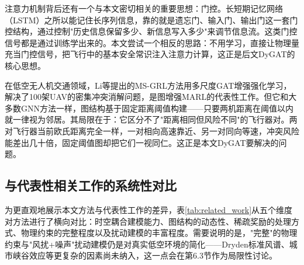 \documentclass[12pt,a4paper,UTF8]{ctexart}
\begin{document}
注意力机制背后还有一个与本文密切相关的重要思想：门控。长短期记忆网络（LSTM）\cite{ref37}之所以能记住长序列信息，靠的就是遗忘门、输入门、输出门这一套门控结构，通过控制"历史信息保留多少、新信息写入多少"来调节信息流。这类门控信号都是通过训练学出来的。本文尝试一个相反的思路：不用学习，直接让物理量充当门控信号，把飞行中的基本安全常识注入注意力计算，这正是后文DyGAT的核心思想。

在低空无人机交通领域，Li等\cite{ref10}提出的MS-GRL方法用多尺度GAT增强强化学习，解决了100架UAV的密集冲突消解问题，是图增强MARL的代表性工作。但它和大多数GNN方法一样，图结构基于固定距离阈值构建——只要两机距离在阈值以内就一律视为邻居。其局限在于：它区分不了"距离相同但风险不同"的飞行器对。两对飞行器当前欧氏距离完全一样，一对相向高速靠近、另一对同向等速，冲突风险能差出几十倍，固定阈值图却把它们一视同仁。这正是本文DyGAT要解决的问题。

\subsection{与代表性相关工作的系统性对比}

为更直观地展示本文方法与代表性工作的差异，表\ref{tab:related_work}从五个维度对方法进行了横向对比：时空耦合建模能力、图结构的动态性、稀疏奖励的处理方式、物理约束的完整程度以及扰动建模的丰富程度。需要说明的是，"完整"的物理约束与"风扰+噪声"扰动建模仍是对真实低空环境的简化——Dryden标准风谱、城市峡谷效应等更复杂的因素尚未纳入，这一点会在第6.3节作为局限性讨论。

\begin{table}[H]
    \centering
    \caption{本文方法与代表性相关工作的系统性对比}
    \label{tab:related_work}
\end{table}
\end{document}
